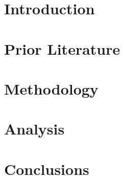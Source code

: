 \documentclass[12pt,letterpaper,oneside]{article}
\title{}
\author{Matt Menzenski}
\date{}
\newenvironment{blargh}[0]%
{\begin{spacing}{1.15}}{\end{spacing}}
\begin{document}
\begin{blargh}

\maketitle

\section{Introduction}

\section{Prior Literature}

\section{Methodology}

\section{Analysis}

\section{Conclusions}




\end{blargh}
\end{document}
